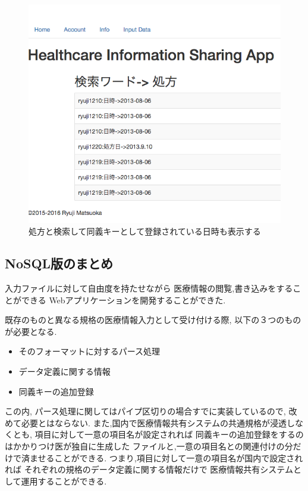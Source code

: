 	\begin{figure}[htbp]
		\begin{center}
			\includegraphics[width=15cm, bb=0 0 609 528, clip]{./gazou/relationApp3.png}
		\end{center}
		\caption{処方と検索して同義キーとして登録されている日時も表示する}
		\label{relationApp}
	\end{figure}


\subsection{NoSQL版のまとめ}
	入力ファイルに対して自由度を持たせながら
	医療情報の閲覧,書き込みをすることができる
	Webアプリケーションを開発することができた.

	既存のものと異なる規格の医療情報入力として受け付ける際,
	以下の３つのものが必要となる.

	\begin{itemize}
		\item そのフォーマットに対するパース処理
		\item データ定義に関する情報
		\item  同義キーの追加登録
	\end{itemize}

	この内, パース処理に関してはパイプ区切りの場合すでに実装しているので,
	改めて必要とはならない.
	また,国内で医療情報共有システムの共通規格が浸透しなくとも,
	項目に対して一意の項目名が設定されれば
	同義キーの追加登録をするのはかかりつけ医が独自に生成した
	ファイルと,一意の項目名との関連付けの分だけで済ませることができる.
	つまり,項目に対して一意の項目名が国内で設定されれば
	それぞれの規格のデータ定義に関する情報だけで
	医療情報共有システムとして運用することができる.
